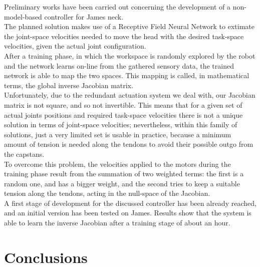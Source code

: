 \documentclass[9pt]{amsart}
\theoremstyle{definition}
\theoremstyle{remark}
\numberwithin{equation}{section}
\newcommand{\To}{\longrightarrow}
\newcommand{\A}{\mathcal{A}}
\begin{document}
Preliminary works have been carried out concerning the development of a non-model-based controller for James neck.\\The planned solution makes use of a Receptive Field Neural Network to extimate the joint-space velocities needed to move the head with the desired task-space velocities, given the actual joint configuration.\\After a training phase, in which the workspace is randomly explored by the robot and the network learns on-line from the gathered sensory data, the trained network is able to map the two spaces. This mapping is called, in mathematical terms, the global inverse Jacobian matrix.\\Unfortunately, due to the redundant actuation system we deal with, our Jacobian matrix is not square, and so not invertible. This means that for a given set of actual joints positions and required task-space velocities there is not a unique solution in terms of joint-space velocities; nevertheless, within this family of solutions, just a very limited set is usable in practice, because a minimum amount of tension is needed along the tendons to avoid their possible outgo from the capstans.\\To overcome this problem, the velocities applied to the motors during the training phase result from the summation of two weighted terms: the first is a random one, and has a bigger weight, and the second tries to keep a suitable tension along the tendons, acting in the null-space of the Jacobian.\\A first stage of development for the discussed controller has been already reached, and an initial version has been tested on James. Results show that the system is able to learn the inverse Jacobian after a training stage of about an hour.


\section{Conclusions} \label{Sec:Conclusions}







\end{document}
